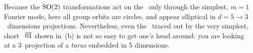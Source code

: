 \documentclass[aip,cha,reprint,
secnumarabic,
nofootinbib, tightenlines,
nobibnotes, showkeys, showpacs,
groupedaddress
]{revtex4-1}
\begin{document}
Because the $\textrm{SO}(2)$ transformations act on the \cLf\ only through the
simplest, $m=1$ Fourier mode, here all group orbits are circles, and
appear elliptical in $d=5 \to 3$~dimensions projections. Nevertheless,
even the \wurst\ traced out by
the very simplest,
short \rpo\
$\overline{01}$ shown in \,(b) is not so
easy to get one's head around: you are looking at a 3\dmn\ projection of
a \emph{torus} embedded in 5 dimensions.

\end{document}
